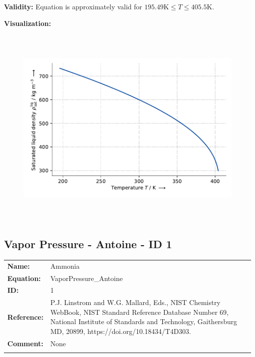 \textbf{Validity:}
\newline
Equation is approximately valid for $195.49 \si{\kelvin} \leq T \leq 405.5 \si{\kelvin}$.
\newline

\textbf{Visualization:}
%
\begin{figure}[!htp]
{\noindent\includegraphics[height=10cm, keepaspectratio]{figs/ref/ref_Ammonia_SaturatedLiquidDensity_EoS1_1.pdf}}
\end{figure}
%

\FloatBarrier
\newpage
\subsection{Vapor Pressure - Antoine - ID 1}
%
\begin{tabular}[l]{|lp{11.5cm}|}
\hline
\addlinespace

\textbf{Name:} & Ammonia \\
\textbf{Equation:} & VaporPressure\_Antoine \\
\textbf{ID:} & 1 \\
\textbf{Reference:} & P.J. Linstrom and W.G. Mallard, Eds., NIST Chemistry WebBook, NIST Standard Reference Database Number 69, National Institute of Standards and Technology, Gaithersburg MD, 20899, https://doi.org/10.18434/T4D303. \\
\textbf{Comment:} & None \\

\addlinespace
\hline
\end{tabular}
\newline

